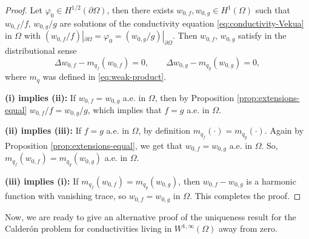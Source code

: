 \documentclass[12pt]{article}
\begin{document}
\begin{proof}
Let $\varphi_0\in H^{1/2}(\partial\Omega)$, then there exists $w_{0,f}, w_{0,g}\in H^1(\Omega)$ such that $w_{0,f}/f$, $w_{0,g}/g$ are solutions of the conductivity equation \eqref{eq:conductivity-Vekua} in $\Omega$ with $(w_{0,f}/f)|_{\partial\Omega}=\varphi_0=(w_{0,g}/g)|_{\partial\Omega}$. Then $w_{0,f}$, $w_{0,g}$ satisfy in the distributional sense
\begin{equation*}
    \Delta w_{0,f}-m_{q_f}(w_{0,f})=0, \qquad \Delta w_{0,g}-m_{q_g}(w_{0,g})=0,
\end{equation*}
where $m_q$ was defined in \eqref{eq:weak-product}.

\textbf{(i) implies (ii):} If $w_{0,f}=w_{0,g}$ a.e. in $\Omega$, then by Proposition \ref{prop:extensions-equal} $w_{0,f}/f=w_{0,g}/g$, which implies that $f=g$ a.e. in $\Omega$.

\textbf{(ii) implies (iii):} If $f=g$ a.e. in $\Omega$, by definition $m_{q_f}(\cdot)=m_{q_g}(\cdot)$. Again by Proposition \ref{prop:extensions-equal}, we get that $w_{0,f}=w_{0,g}$ a.e. in $\Omega$. So, $m_{q_f}(w_{0,f})=m_{q_g}(w_{0,g})$ a.e. in $\Omega$.

\textbf{(iii) implies (i):} If $m_{q_f}(w_{0,f})=m_{q_g}(w_{0,g})$, then $w_{0,f}-w_{0,g}$ is a harmonic function with vanishing trace, so $w_{0,f}=w_{0,g}$ in $\Omega$.
This completes the proof.
\end{proof}
Now, we are ready to give an alternative proof of the uniqueness result for the Calderón problem for conductivities living in $W^{1,\infty}(\Omega)$ away from zero.
\end{document}
